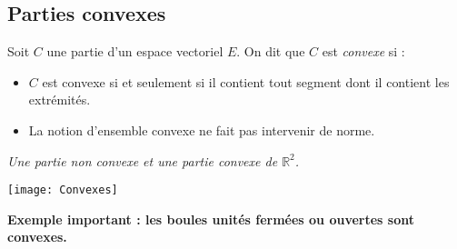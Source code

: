 \documentclass[a4paper,10pt]{report}
\begin{document}
\subsection{Parties convexes}

\begin{Definition}{} Soit $C$ une partie d'un espace vectoriel $E$. On dit que $C$ est \emph{convexe} si :

\vspace{1cm}

\end{Definition}

\begin{Remarques}{}
\begin{itemize} 
\item $C$ est convexe si et seulement si il contient tout segment dont il contient les extrémités.
\item La notion d'ensemble convexe ne fait pas intervenir de norme.
\end{itemize}
\end{Remarques}{}

\begin{center}
\emph{Une partie non convexe et une partie convexe de $\mathbb{R}^2$.}
\end{center}

\begin{center}
\texttt{[image: Convexes]}
\end{center}

\textbf{Exemple important : les boules unités fermées ou ouvertes sont convexes.}


\vspace{6cm}
%
\end{document}
